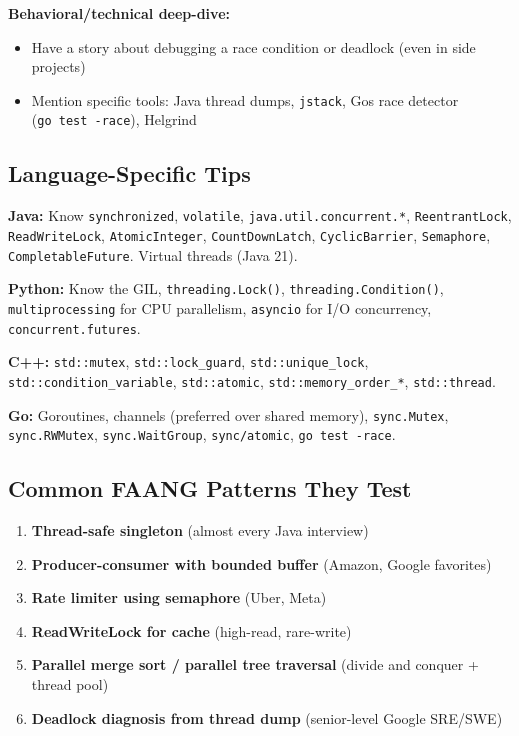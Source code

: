 \documentclass[11pt]{article}
\providecommand{\tightlist}{\setlength{\itemsep}{1pt}\setlength{\parskip}{0pt}}
\begin{document}
\textbf{Behavioral/technical deep-dive:}

\begin{itemize}
\tightlist
\item
  Have a story about debugging a race condition or deadlock (even in side projects)
\item
  Mention specific tools: Java thread dumps, \texttt{jstack}, Go\textquotesingle s race detector (\texttt{go\ test\ -race}), Helgrind
\end{itemize}

\subsection{Language-Specific Tips}\label{language-specific-tips}

\textbf{Java:} Know \texttt{synchronized}, \texttt{volatile}, \texttt{java.util.concurrent.*}, \texttt{ReentrantLock}, \texttt{ReadWriteLock}, \texttt{AtomicInteger}, \texttt{CountDownLatch}, \texttt{CyclicBarrier}, \texttt{Semaphore}, \texttt{CompletableFuture}. Virtual threads (Java 21).

\textbf{Python:} Know the GIL, \texttt{threading.Lock()}, \texttt{threading.Condition()}, \texttt{multiprocessing} for CPU parallelism, \texttt{asyncio} for I/O concurrency, \texttt{concurrent.futures}.

\textbf{C++:} \texttt{std::mutex}, \texttt{std::lock\_guard}, \texttt{std::unique\_lock}, \texttt{std::condition\_variable}, \texttt{std::atomic}, \texttt{std::memory\_order\_*}, \texttt{std::thread}.

\textbf{Go:} Goroutines, channels (preferred over shared memory), \texttt{sync.Mutex}, \texttt{sync.RWMutex}, \texttt{sync.WaitGroup}, \texttt{sync/atomic}, \texttt{go\ test\ -race}.

\subsection{Common FAANG Patterns They Test}\label{common-faang-patterns-they-test}

\begin{enumerate}
\def\labelenumi{\arabic{enumi}.}
\tightlist
\item
  \textbf{Thread-safe singleton} (almost every Java interview)
\item
  \textbf{Producer-consumer with bounded buffer} (Amazon, Google favorites)
\item
  \textbf{Rate limiter using semaphore} (Uber, Meta)
\item
  \textbf{ReadWriteLock for cache} (high-read, rare-write)
\item
  \textbf{Parallel merge sort / parallel tree traversal} (divide and conquer + thread pool)
\item
  \textbf{Deadlock diagnosis from thread dump} (senior-level Google SRE/SWE)
\end{enumerate}
\end{document}
